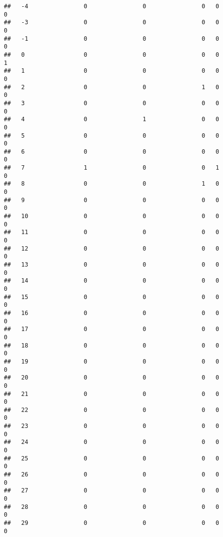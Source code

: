 \documentclass[]{article}
\begin{document}
\begin{verbatim}
##   -4                0                0                0   0                0
##   -3                0                0                0   0                0
##   -1                0                0                0   0                0
##   0                 0                0                0   0                1
##   1                 0                0                0   0                0
##   2                 0                0                1   0                0
##   3                 0                0                0   0                0
##   4                 0                1                0   0                0
##   5                 0                0                0   0                0
##   6                 0                0                0   0                0
##   7                 1                0                0   1                0
##   8                 0                0                1   0                0
##   9                 0                0                0   0                0
##   10                0                0                0   0                0
##   11                0                0                0   0                0
##   12                0                0                0   0                0
##   13                0                0                0   0                0
##   14                0                0                0   0                0
##   15                0                0                0   0                0
##   16                0                0                0   0                0
##   17                0                0                0   0                0
##   18                0                0                0   0                0
##   19                0                0                0   0                0
##   20                0                0                0   0                0
##   21                0                0                0   0                0
##   22                0                0                0   0                0
##   23                0                0                0   0                0
##   24                0                0                0   0                0
##   25                0                0                0   0                0
##   26                0                0                0   0                0
##   27                0                0                0   0                0
##   28                0                0                0   0                0
##   29                0                0                0   0                0

\end{verbatim}
\end{document}
